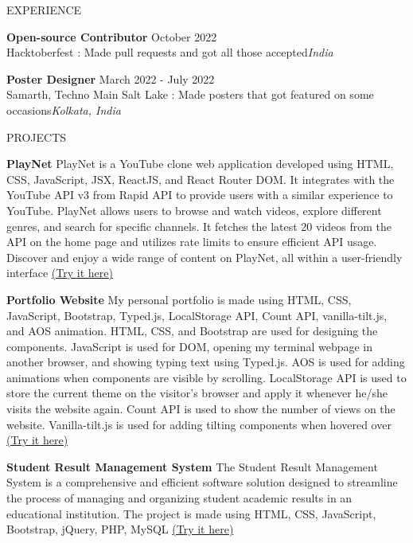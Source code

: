 \documentclass{resume} %
\begin{document}
\begin{rSection}{EXPERIENCE}

\textbf{Open-source Contributor} \hfill October 2022\\
Hacktoberfest : Made pull requests and got all those accepted\hfill \textit{India}
 
 
\textbf{Poster Designer} \hfill March 2022 - July 2022\\
Samarth, Techno Main Salt Lake : Made posters that got featured on some occasions\hfill \textit{Kolkata, India}
 

\end{rSection} 


\begin{rSection}{PROJECTS}
\vspace{-1.1em}
\item \textbf{PlayNet} {PlayNet is a YouTube clone web application developed using HTML, CSS, JavaScript, JSX, ReactJS, and React Router DOM. It integrates with the YouTube API v3 from Rapid API to provide users with a similar experience to YouTube. PlayNet allows users to browse and watch videos, explore different genres, and search for specific channels. It fetches the latest 20 videos from the API on the home page and utilizes rate limits to ensure efficient API usage. Discover and enjoy a wide range of content on PlayNet, all within a user-friendly interface \href{https://playnet-sandy.vercel.app/}{(Try it here)}}
\item \textbf{Portfolio Website} {My personal portfolio is made using HTML, CSS, JavaScript, Bootstrap, Typed.js, LocalStorage API, Count API, vanilla-tilt.js, and AOS animation. HTML, CSS, and Bootstrap are used for designing the components. JavaScript is used for DOM, opening my terminal webpage in another browser, and showing typing text using Typed.js. AOS is used for adding animations when components are visible by scrolling. LocalStorage API is used to store the current theme on the visitor’s browser and apply it whenever he/she visits the website again. Count API is used to show the number of views on the website. Vanilla-tilt.js is used for adding tilting components when hovered over
\href{https://arkapg211002.github.io/}{(Try it here)}}
\item \textbf{Student Result Management System} {The Student Result Management System is a comprehensive and efficient software solution designed to streamline the process of managing and organizing student academic results in an educational institution. The project is made using HTML, CSS, JavaScript, Bootstrap, jQuery, PHP, MySQL \href{https://13000121058arkapratimghoshsrms.000webhostapp.com/}{(Try it here)}}
\end{rSection} 
\end{document}
